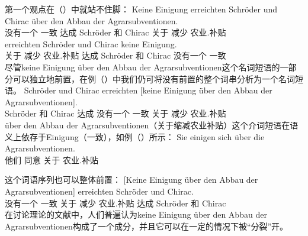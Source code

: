 第一个观点在（）中就站不住脚：
\eal
\ex
\gll Keine Einigung erreichten Schröder und Chirac über den          Abbau der          Agrarsubventionen.\footnotemark\\
     没有一个    一致      达成        Schröder 和  Chirac 关于   减少   农业.补贴\\
\ex 
{}     erreichten Schröder und Chirac keine Einigung.\\
     \spacebr{}关于  减少  农业.补贴 达成 Schröder 和 Chirac 没有一个 一致\\
\zl
尽管keine Einigung über den Abbau der Agrarsubventionen这个名词短语的一部分可以独立地前置，在例（）中我们仍可将没有前置的整个词串分析为一个名词短语。
\ea
\gll Schröder und Chirac erreichten [keine Einigung über den Abbau der Agrarsubventionen].\\
     Schröder 和 Chirac 达成 \spacebr{}没有一个 一致 关于  减少  农业.补贴\\
\z
über den Abbau der Agrarsubventionen（关于缩减农业补贴）这个介词短语在语义上依存于Einigung（一致），如例（）所示：
\ea
\gll Sie einigen sich über die Agrarsubventionen.\\
     他们 同意  关于  农业.补贴\\
\z

这个词语序列也可以整体前置：
\ea
\gll {}[Keine Einigung über den Abbau der Agrarsubventionen] erreichten Schröder und Chirac.\\
     \spacebr{}没有一个 一致 关于  减少  农业.补贴  达成 Schröder 和 Chirac\\
\z
在讨论理论的文献中，人们普遍认为keine Einigung über den Abbau der Agrarsubventionen构成了一个成分，并且它可以在一定的情况下被“分裂”开。

